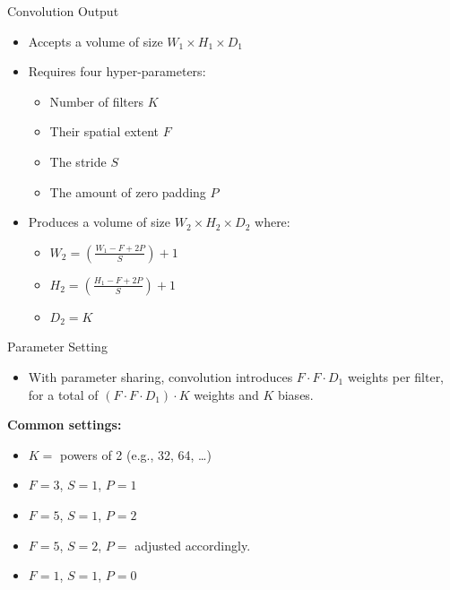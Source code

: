 \documentclass[default, aspectratio=169]{beamer}
\begin{document}
	\begin{frame}{Convolution Output}
		\begin{itemize}
			\item Accepts a volume of size $W_1 \times H_1 \times D_1$
			\item Requires four hyper-parameters:
			\begin{itemize}
				\item Number of filters $K$
				\item Their spatial extent $F$
				\item The stride $S$
				\item The amount of zero padding $P$
			\end{itemize}
			
			\item Produces a volume of size $W_2 \times H_2 \times D_2$ where:
			\begin{itemize}
				\item $W_2 = \left( \frac{W_1 - F + 2P}{S} \right) + 1$
				\item $H_2 = \left( \frac{H_1 - F + 2P}{S} \right) + 1$
				\vspace{2pt}
				\item $D_2 = K$
			\end{itemize}
		\end{itemize}
		
	\end{frame}
	\begin{frame}{Parameter Setting}
		
		
		\begin{minipage}{0.50\textwidth} %
			\begin{itemize}
				\item With parameter sharing, convolution introduces $F \cdot F \cdot D_1$ weights per filter, for a total of $(F \cdot F \cdot D_1) \cdot K$ weights and $K$ biases.
			\end{itemize}
		\end{minipage}
		\hfill %
		\begin{minipage}{0.45\textwidth} %
			\textbf{Common settings:}
			\begin{itemize}
				\item $K =$ powers of 2 (e.g., 32, 64, \dots)
				\item $F = 3$, $S = 1$, $P = 1$
				\item $F = 5$, $S = 1$, $P = 2$
				\item $F = 5$, $S = 2$, $P = $ adjusted accordingly.
				\item $F = 1$, $S = 1$, $P = 0$
			\end{itemize}
		\end{minipage}
	\end{frame}
	
\end{document}
